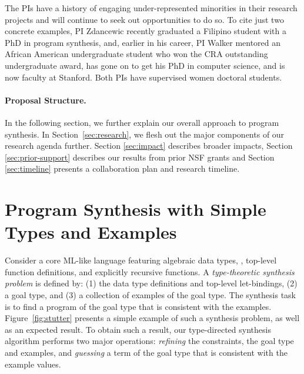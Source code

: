 The PIs have a history of engaging under-represented minorities in 
their research projects and will continue to seek out opportunities to do so.
To cite just two concrete examples, PI Zdancewic recently graduated a Filipino
student with a PhD in program synthesis, and, earlier in his career, PI Walker
mentored an African American undergraduate student who won the CRA outstanding
undergraduate award, has gone on to get his PhD in computer science, and is 
now faculty at Stanford.  Both PIs have supervised women doctoral students.

\paragraph*{Proposal Structure.}  In the following section, we further
explain our overall approach to program synthesis.  
In Section~\ref{sec:research}, we flesh out the major components of our
research agenda further.  
Section \ref{sec:impact} describes broader impacts,
Section \ref{sec:prior-support} describes our results from
prior NSF grants and Section \ref{sec:timeline} presents a
collaboration plan and research timeline.



\section{Program Synthesis with Simple Types and Examples}
\label{sec:prior}

Consider a core ML-like language featuring algebraic data types,
, top-level function definitions, and explicitly recursive
functions. A \emph{type-theoretic synthesis problem} is defined by: 
(1) the data type
definitions and top-level let-bindings, (2) a goal type, and (3) a
collection of examples of the goal type.  The synthesis task is to
find a program of the goal type that is consistent with the examples.
Figure~\ref{fig:stutter} presents a simple example of such a synthesis 
problem, as well as an expected result.
To obtain such a result, our type-directed synthesis algorithm
performs two major operations: \emph{refining}
the constraints, the goal type and examples, and \emph{guessing} a
term of the goal type that is consistent with the example values.

